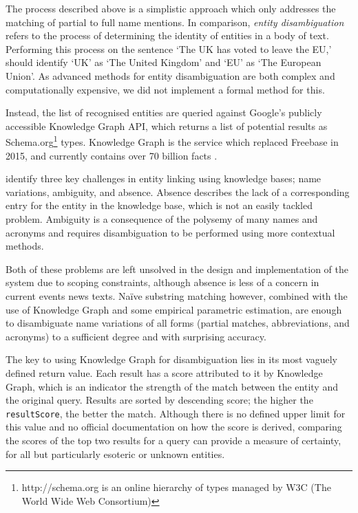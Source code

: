 The process described above is a simplistic approach which only addresses the matching of partial to full name mentions. In comparison, \textit{entity disambiguation} refers to the process of determining the identity of entities in a body of text. Performing this process on the sentence `The UK has voted to leave the EU,' should identify `UK' as `The United Kingdom' and `EU' as `The European Union'. As advanced methods for entity disambiguation are both complex and computationally expensive, we did not implement a formal method for this. 

Instead, the list of recognised entities are queried against Google's publicly accessible Knowledge Graph API, which returns a list of potential results as Schema.org\footnote{http://schema.org is an online hierarchy of types managed by W3C (The World Wide Web Consortium)} types. Knowledge Graph is the service which replaced Freebase in 2015, and currently contains over 70 billion facts \citep{knowledgegraph}.

\cite{EntityDisambiguationForKnowledgeBasePopulation} identify three key challenges in entity linking using knowledge bases; name variations, ambiguity, and absence. Absence describes the lack of a corresponding entry for the entity in the knowledge base, which is not an easily tackled problem. Ambiguity is a consequence of the polysemy of many names and acronyms and requires disambiguation to be performed using more contextual methods. 

Both of these problems are left unsolved in the design and implementation of the system due to scoping constraints, although absence is less of a concern in current events news texts. Na\"{i}ve substring matching however, combined with the use of Knowledge Graph and some empirical parametric estimation, are enough to disambiguate name variations of all forms (partial matches, abbreviations, and acronyms) to a sufficient degree and with surprising accuracy.

The key to using Knowledge Graph for disambiguation lies in its most vaguely defined return value. Each result has a score attributed to it by Knowledge Graph, which is an indicator the strength of the match between the entity and the original query. Results are sorted by descending score; the higher the \texttt{resultScore}, the better the match. Although there is no defined upper limit for this value and no official documentation on how the score is derived, comparing the scores of the top two results for a query can provide a measure of certainty, for all but particularly esoteric or unknown entities.

